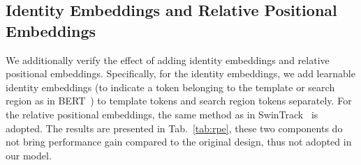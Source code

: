 \begin{table}[t]
\centering
\caption{Ablation study on different choices of template tokens used to identify candidates belonging to background.}
\label{tab:token_sec}
\end{table} 
\subsection{Identity Embeddings and Relative Positional Embeddings}
We additionally verify the effect of adding identity embeddings and relative positional embeddings. Specifically, for the identity embeddings, we add learnable identity embeddings (to indicate a token belonging to the template or search region as in BERT~\cite{bert}) to template tokens and search region tokens separately. For the relative positional embeddings, the same method as in SwinTrack~\cite{swintrack} is adopted. The results are presented in Tab.~\ref{tab:rpe}, these two components do not bring performance gain compared to the original design, thus not adopted in our model.

